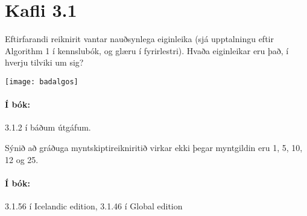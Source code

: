 \documentclass{article}
\begin{document}
\section{Kafli 3.1}

\question

Eftirfarandi reiknirit vantar nauðsynlega eiginleika (sjá upptalningu eftir Algorithm 1 í kennslubók, og glæru í fyrirlestri). Hvaða eiginleikar eru það, í hverju tilviki um sig?

\begin{center}
    \texttt{[image: badalgos]}
\end{center}

\paragraph{Í bók:} 3.1.2 í báðum útgáfum.

\question

Sýnið að gráðuga myntskiptireikniritið virkar ekki þegar myntgildin eru 1, 5, 10, 12 og 25.

\paragraph{Í bók:} 3.1.56 í Icelandic edition, 3.1.46 í Global edition
\end{document}
